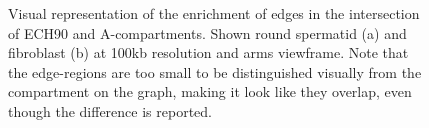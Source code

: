 \documentclass[
  11pt,
  a4paper,
]{scrbook}
\begin{document}
\begin{figure}

\begin{minipage}{0.50\linewidth}



\end{minipage}%
%
\begin{minipage}{0.50\linewidth}



\end{minipage}%

\caption{\label{fig-edge-enrichment}Visual representation of the
enrichment of edges in the intersection of ECH90 and A-compartments.
Shown round spermatid (a) and fibroblast (b) at 100kb resolution and
arms viewframe. Note that the edge-regions are too small to be
distinguished visually from the compartment on the graph, making it look
like they overlap, even though the difference is reported.}

\end{figure}%
\end{document}
